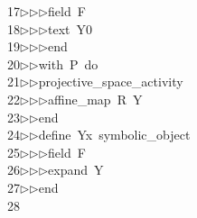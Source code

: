 \begin{tabbing}
17\>$\triangleright$\>$\triangleright$\>$\triangleright$\>field\ F\ \\[0pt]
18\>$\triangleright$\>$\triangleright$\>$\triangleright$\>text\ Y0\ \\[0pt]
19\>$\triangleright$\>$\triangleright$\>$\triangleright$\>end\ \\[0pt]
20\>$\triangleright$\>$\triangleright$\>with\ P\ do\ \\[0pt]
21\>$\triangleright$\>$\triangleright$\>projective\_space\_activity\ \\[0pt]
22\>$\triangleright$\>$\triangleright$\>$\triangleright$\>affine\_map\ R\ Y\ \ \\[0pt]
23\>$\triangleright$\>$\triangleright$\>end\ \\[0pt]
24\>$\triangleright$\>$\triangleright$\>define\ Yx\ symbolic\_object\ \\[0pt]
25\>$\triangleright$\>$\triangleright$\>$\triangleright$\>field\ F\ \\[0pt]
26\>$\triangleright$\>$\triangleright$\>$\triangleright$\>expand\ Y\ \\[0pt]
27\>$\triangleright$\>$\triangleright$\>end\\[0pt]
28\>\end{tabbing}
